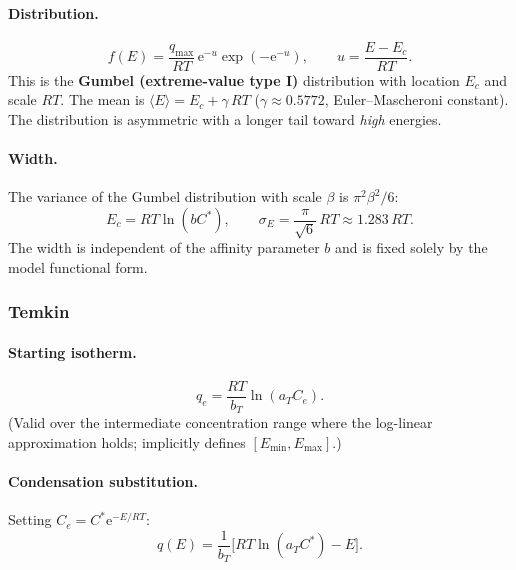 \documentclass[journal=aamick,manuscript=article]{achemso}
\begin{document}
\paragraph{Distribution.}
\begin{equation}
	f(E) = \frac{q_{\max}}{RT}\,\mathrm{e}^{-u}\exp\!\left(-\mathrm{e}^{-u}\right),
	\qquad u = \frac{E-E_c}{RT}.
	\label{eq:si_fE_jov}
\end{equation}
This is the \textbf{Gumbel (extreme-value type I)} distribution with location $E_c$
and scale $RT$. The mean is $\langle E\rangle = E_c + \gamma\,RT$
($\gamma \approx 0.5772$, Euler--Mascheroni constant).
The distribution is asymmetric with a longer tail toward \emph{high} energies.

\paragraph{Width.}
The variance of the Gumbel distribution with scale $\beta$ is $\pi^2\beta^2/6$:
\begin{equation}
	E_c = RT\ln(bC^{\ast}),
	\qquad
	\sigma_E = \frac{\pi}{\sqrt{6}}\,RT \approx 1.283\,RT.
	\label{eq:si_sigmaE_jov}
\end{equation}
The width is independent of the affinity parameter $b$ and is fixed solely by
the model functional form.

\subsubsection{Temkin}

\paragraph{Starting isotherm.}
\begin{equation}
	q_e = \frac{RT}{b_T}\ln(a_T C_e).
\end{equation}
(Valid over the intermediate concentration range where the log-linear
approximation holds; implicitly defines $[E_{\min}, E_{\max}]$.)

\paragraph{Condensation substitution.}
Setting $C_e = C^{\ast}\mathrm{e}^{-E/RT}$:
\begin{equation}
	q(E) = \frac{1}{b_T}\bigl[RT\ln(a_T C^{\ast}) - E\bigr].
\end{equation}
\end{document}
